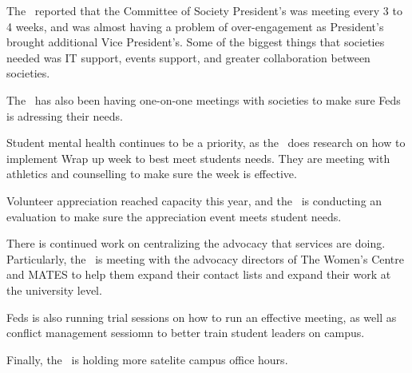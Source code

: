 \begin{information}

    The \vpi\ reported that the Committee of Society President's was meeting 
    every 3 to 4 weeks, and was almost having a problem of over-engagement as 
    President's brought additional Vice President's. Some of the biggest things
    that societies needed was IT support, events support, and greater
    collaboration between societies. 

    The \vpi\ has also been having one-on-one meetings with societies to make
    sure Feds is adressing their needs.

    Student mental health continues to be a priority, as the \vpi\ does 
    research on how to implement Wrap up week to best meet students needs. They
    are meeting with athletics and counselling to make sure the week is
    effective.

    Volunteer appreciation reached capacity this year, and the \vpi\ is 
    conducting an evaluation to make sure the appreciation event meets student
    needs.

    There is continued work on centralizing the advocacy that services are 
    doing. Particularly, the \vpi\ is meeting with the advocacy directors of 
    The Women's Centre and MATES to help them expand their contact lists and 
    expand their work at the university level. 

    Feds is also running trial sessions on how to run an effective meeting, as
    well as conflict management sessiomn to better train student leaders on
    campus. 

    Finally, the \vpi\ is holding more satelite campus office hours.
    
\end{information}

